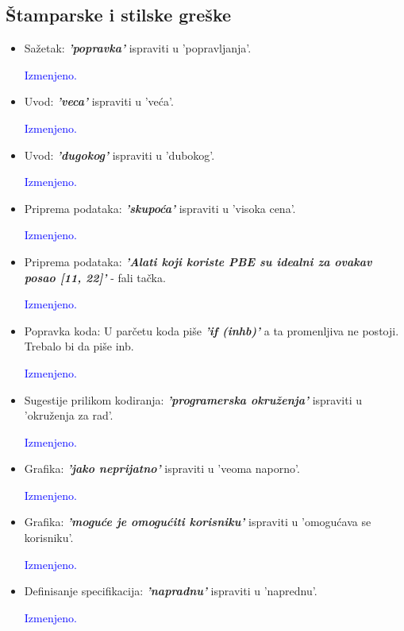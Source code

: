\documentclass[a4paper]{report}
\newcommand{\odgovor}[1]{\textcolor{blue}{#1}}
\begin{document}
\subsection{Štamparske i stilske greške}
\begin{itemize}
	\item Sažetak: \textbf{\textit{'popravka'}} ispraviti u 'popravljanja'.

    \odgovor{Izmenjeno.}

	\item Uvod: \textbf{\textit{'veca'}} ispraviti u 'veća'.

	\odgovor{Izmenjeno.}

    \item Uvod: \textbf{\textit{'dugokog'}} ispraviti u 'dubokog'.

    \odgovor{Izmenjeno.}

    \item Priprema podataka: \textbf{\textit{'skupoća'}} ispraviti u 'visoka cena'.

    \odgovor{Izmenjeno.}

    \item Priprema podataka: \textbf{\textit{'Alati koji koriste PBE su idealni za ovakav posao [11, 22]'}} - fali tačka.

    \odgovor{Izmenjeno.}

    \item Popravka koda: U parčetu koda piše \textbf{\textit{'if (inhb)'}} a ta promenljiva ne postoji. Trebalo bi da piše inb.

    \odgovor{Izmenjeno.}

    \item Sugestije prilikom kodiranja: \textbf{\textit{'programerska okruženja'}} ispraviti u 'okruženja za rad'.

    \odgovor{Izmenjeno.}

    \item Grafika: \textbf{\textit{'jako neprijatno'}} ispraviti u 'veoma naporno'.

    \odgovor{Izmenjeno.}

    \item Grafika: \textbf{\textit{'moguće je omogućiti korisniku'}} ispraviti u 'omogućava se korisniku'.

    \odgovor{Izmenjeno.}

    \item Definisanje specifikacija: \textbf{\textit{'napradnu'}} ispraviti u 'naprednu'.

    \odgovor{Izmenjeno.}


\end{itemize}
\end{document}
